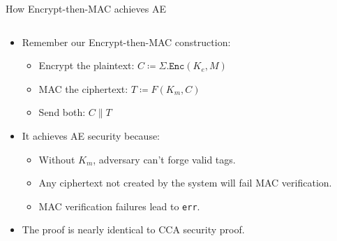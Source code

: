 \documentclass[aspectratio=169, lualatex, handout]{beamer}
\begin{document}
\begin{frame}{How Encrypt-then-MAC achieves AE}
	\begin{columns}[c]
		\begin{column}{0.6\textwidth}
			\begin{itemize}[<+->]
				\item Remember our Encrypt-then-MAC construction:
				      \begin{itemize}
					      \item Encrypt the plaintext: $C \coloneq \Sigma.\texttt{Enc}(K_e, M)$
					      \item MAC the ciphertext: $T \coloneq F(K_m, C)$
					      \item Send both: $C\|T$
				      \end{itemize}
				\item It achieves AE security because:
				      \begin{itemize}
					      \item Without $K_m$, adversary can't forge valid tags.
					      \item Any ciphertext not created by the system will fail MAC verification.
					      \item MAC verification failures lead to \texttt{err}.
				      \end{itemize}
				\item The proof is nearly identical to CCA security proof.
			\end{itemize}
		\end{column}
		\begin{column}{0.4\textwidth}
			\vspace{0.5em}
		\end{column}
	\end{columns}
\end{frame}
\end{document}

